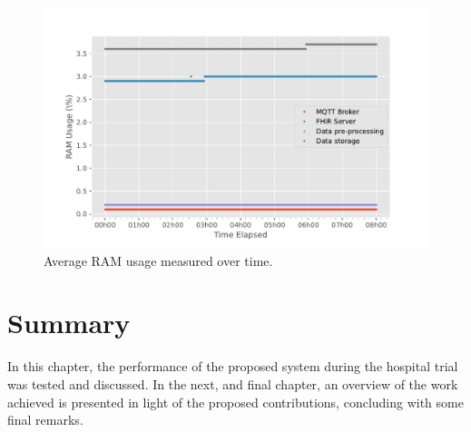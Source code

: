 \begin{figure}[H]
    \centering
    \includegraphics[width=0.66\linewidth]{images/PILOTram_usage.pdf}
    \caption{Average RAM usage measured over time.}
    \label{fig:pilot-ram-usage}
\end{figure}








\section{Summary}
In this chapter, the performance of the proposed system during the hospital trial was tested and discussed. 
In the next, and final chapter, an overview of the work achieved is presented in light of the proposed contributions, concluding with some final remarks.